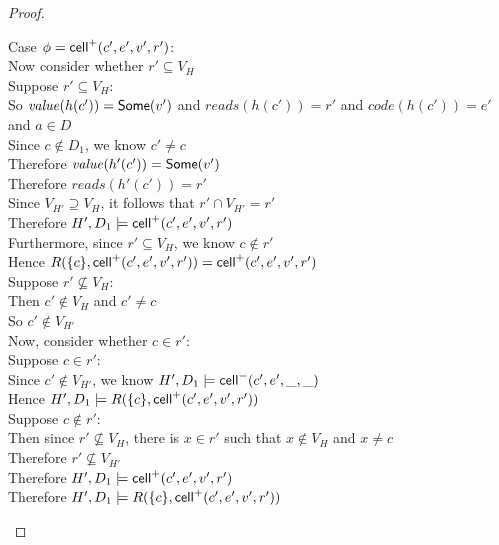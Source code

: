 \begin{proof}
\begin{tabbedproof}
    \ooo Case $\phi = \mathsf{cell}^{+}({c'}, {e'}, {v'}, {r'})$: \\
    \oooo Now consider whether $r' \subseteq V_H$ \\
    \oooo Suppose $r' \subseteq V_{H}$: \\
    \ooooo So $\mathit{value}(h(c')) = \mathsf{Some}(v')$ and $\mathit{reads}(h(c')) = r'$ and
           $\mathit{code}(h(c')) = e'$ and $a \in D$ \\
    \ooooo Since $c \not \in D_1$, we know $c' \not= c$ \\
    \ooooo Therefore $\mathit{value}(h'(c')) = \mathsf{Some}(v')$ \\
    \ooooo Therefore $\mathit{reads}(h'(c')) = r'$ \\
    \ooooo Since $V_{H'} \supseteq V_H$, it follows that $r' \cap V_{H'} = r'$ \\
    \ooooo Therefore $H', D_1 \models \mathsf{cell}^{+}({c'}, {e'}, {v'}, {r'})$ \\
    \ooooo Furthermore, since $r' \subseteq V_H$, we know $c \not\in r'$ \\
    \ooooo Hence $R(\{{c}\}, \mathsf{cell}^{+}({c'}, {e'}, {v'}, {r'})) = \mathsf{cell}^{+}({c'}, {e'}, {v'}, {r'})$ \\
    \oooo Suppose $r' \not\subseteq V_{H}$: \\
    \ooooo Then $c' \not\in V_H$ and $c' \not= c$\\
    \ooooo So $c' \not \in V_{H'}$ \\
    \ooooo Now, consider whether $c \in r'$: \\
    \ooooo Suppose $c \in r'$: \\
    \oooooo Since $c' \not \in V_{H'}$, we know $H', D_1 \models \mathsf{cell}^{-}({c'}, {e'}, {\_}, {\_})$ \\
    \oooooo Hence $H', D_1 \models R(\{{c}\}, \mathsf{cell}^{+}({c'}, {e'}, {v'}, {r'}))$ \\
    \ooooo Suppose $c \not\in r'$: \\
    \oooooo Then since $r' \not\subseteq V_H$, there is $x \in r'$ such that $x \not \in V_H$ and $x \not= c$ \\
    \oooooo Therefore $r' \not\subseteq V_{H'}$ \\
    \oooooo Therefore $H', D_1 \models \mathsf{cell}^{+}({c'}, {e'}, {v'}, {r'})$ \\
    \oooooo Therefore $H', D_1 \models R(\{{c}\}, \mathsf{cell}^{+}({c'}, {e'}, {v'}, {r'}))$ 
  \end{tabbedproof}
\end{proof}

